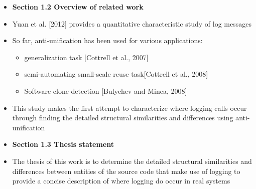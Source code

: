 \documentclass{article}
\newcommand{\bold}{\textbf}
\begin{document}
\begin{itemize} [leftmargin=.1in]
\item \bold{Section 1.2 Overview of related work}
\item Yuan et al. [2012]  provides a quantitative characteristic study of log messages 
\item So far, anti-unification has been used for various applications:
\begin{itemize}
\item generalization task [Cottrell et al., 2007]
\item semi-automating small-scale reuse task[Cottrell et al., 2008]
\item Software clone detection [Bulychev and Minea, 2008]
\end{itemize}
\item This study makes the first attempt to characterize where logging calls occur through finding the detailed structural similarities and differences using anti-unification

\item \bold{Section 1.3 Thesis statement}
\item The thesis of this work is to determine the detailed structural similarities and differences between entities of the source code that make use of logging to provide a concise description of where logging do occur in real systems


\end{itemize}
\end{document}

